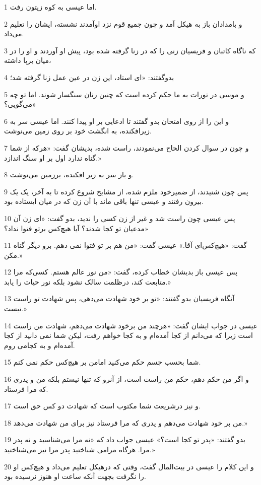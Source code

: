 \par 1 اما عیسی به کوه زیتون رفت.
\par 2 و بامدادان باز به هیکل آمد و چون جمیع قوم نزد اوآمدند نشسته، ایشان را تعلیم می‌داد.
\par 3 که ناگاه کاتبان و فریسیان زنی را که در زنا گرفته شده بود، پیش او آوردند و او را در میان برپا داشته،
\par 4 بدوگفتند: «ای استاد، این زن در عین عمل زنا گرفته شد؛
\par 5 و موسی در تورات به ما حکم کرده است که چنین زنان سنگسار شوند. اما تو چه می‌گویی؟»
\par 6 و این را از روی امتحان بدو گفتند تا ادعایی بر او پیدا کنند. اما عیسی سر به زیرافکنده، به انگشت خود بر روی زمین می‌نوشت.
\par 7 و چون در سوال کردن الحاح می‌نمودند، راست شده، بدیشان گفت: «هر‌که از شما گناه ندارد اول بر او سنگ اندازد.»
\par 8 و باز سر به زیر افکنده، برزمین می‌نوشت.
\par 9 پس چون شنیدند، از ضمیرخود ملزم شده، از مشایخ شروع کرده تا به آخر، یک یک بیرون رفتند و عیسی تنها باقی ماند با آن زن که در میان ایستاده بود.
\par 10 پس عیسی چون راست شد و غیر از زن کسی را ندید، بدو گفت: «ای زن آن مدعیان تو کجا شدند؟ آیا هیچ‌کس برتو فتوا نداد؟»
\par 11 گفت: «هیچ‌کس‌ای آقا.» عیسی گفت: «من هم بر تو فتوا نمی دهم. برو دیگر گناه مکن.»
\par 12 پس عیسی باز بدیشان خطاب کرده، گفت: «من نور عالم هستم. کسی‌که مرا متابعت کند، درظلمت سالک نشود بلکه نور حیات را یابد.»
\par 13 آنگاه فریسیان بدو گفتند: «تو بر خود شهادت می‌دهی، پس شهادت تو راست نیست.»
\par 14 عیسی در جواب ایشان گفت: «هرچند من برخود شهادت می‌دهم، شهادت من راست است زیرا که می‌دانم از کجا آمده‌ام و به کجا خواهم رفت، لیکن شما نمی دانید از کجا آمده‌ام و به کجامی روم.
\par 15 شما بحسب جسم حکم می‌کنید امامن بر هیچ‌کس حکم نمی کنم.
\par 16 و اگر من حکم دهم، حکم من راست است، از آنرو که تنها نیستم بلکه من و پدری که مرا فرستاد.
\par 17 و نیز درشریعت شما مکتوب است که شهادت دو کس حق است.
\par 18 من بر خود شهادت می‌دهم و پدری که مرا فرستاد نیز برای من شهادت می‌دهد.»
\par 19 بدو گفتند: «پدر تو کجا است؟» عیسی جواب داد که «نه مرا می‌شناسید و نه پدر مرا. هرگاه مرامی شناختید پدر مرا نیز می‌شناختید.»
\par 20 و این کلام را عیسی در بیت‌المال گفت، وقتی که درهیکل تعلیم می‌داد و هیچ‌کس او را نگرفت بجهت آنکه ساعت او هنوز نرسیده بود.
